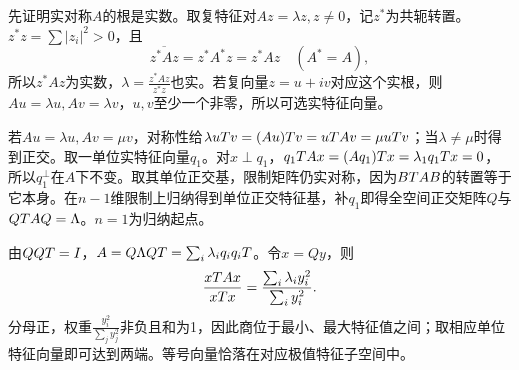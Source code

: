 \label{der:5-3}
先证明实对称$A$的根是实数。取复特征对$Az=\lambda z,z\ne0$，记$z^*$为共轭转置。$z^*z=\sum|z_i|^2>0$，且
\[\overline{z^*Az}=z^*A^*z=z^*Az\quad(A^*=A),\]
所以$z^*Az$为实数，$\lambda=\frac{z^*Az}{z^*z}$也实。若复向量$z=u+iv$对应这个实根，则$Au=\lambda u,Av=\lambda v$，$u,v$至少一个非零，所以可选实特征向量。

若$Au=\lambda u,Av=\mu v$，对称性给$\lambda uT v=(Au)T v=uT Av=\mu uT v$；当$\lambda\ne\mu$时得到正交。取一单位实特征向量$q_1$。对$x\perp q_1$，$q_1T Ax=(Aq_1)T x=\lambda_1q_1T x=0$，所以$q_1^\perp$在$A$下不变。取其单位正交基，限制矩阵仍实对称，因为$BT AB$的转置等于它本身。在$n-1$维限制上归纳得到单位正交特征基，补$q_1$即得全空间正交矩阵$Q$与$QT AQ=\Lambda$。$n=1$为归纳起点。

由$QQT=I$，$A=Q\Lambda QT=\sum_i\lambda_iq_iq_iT$。令$x=Qy$，则
\[\dfrac{xT Ax}{xT x}=\dfrac{\sum_i\lambda_i y_i^2}{\sum_i y_i^2}.
\]
分母正，权重$\frac{y_i^2}{\sum_jy_j^2}$非负且和为1，因此商位于最小、最大特征值之间；取相应单位特征向量即可达到两端。等号向量恰落在对应极值特征子空间中。
